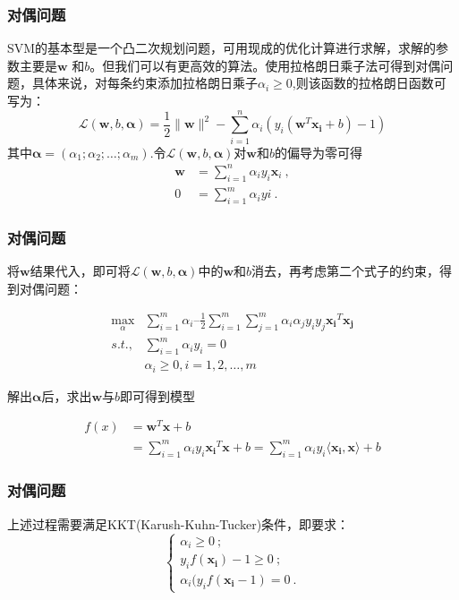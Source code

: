 \begin{frame}
\frametitle{对偶问题}
SVM的基本型是一个凸二次规划问题，可用现成的优化计算进行求解，求解的参数主要是$\boldsymbol{w}$ 和$b$。但我们可以有更高效的算法。使用拉格朗日乘子法可得到对偶问题，具体来说，对每条约束添加拉格朗日乘子$\alpha_i \ge0$,则该函数的拉格朗日函数可写为：
\[
\mathcal{L}(\boldsymbol{w},b,\boldsymbol{\alpha})=\frac{1}{2}\|\boldsymbol{w}\|^2-\sum_{i=1}^n\alpha_i \left(y_i(\boldsymbol{w}^T\boldsymbol{x_i}+b)-1\right)
\]
其中$\boldsymbol{\alpha} = (\alpha_1;\alpha_2;\dots;\alpha_m)$.令$\mathcal{L}(\boldsymbol{w},b,\boldsymbol{\alpha})$对$\boldsymbol{w}$和$b$的偏导为零可得
\begin{align*}
\boldsymbol{w} &= \sum_{i=1}^n\alpha_i y_i \boldsymbol{x}_i\ ,\\
0&=\sum_{i=1}^m\alpha_iyi\ .
\end{align*}

\end{frame}


\begin{frame}

\frametitle{对偶问题}

将$\boldsymbol{w}$结果代入，即可将$\mathcal{L}(\boldsymbol{w},b,\boldsymbol{\alpha})$中的$\boldsymbol{w}$和$b$消去，再考虑第二个式子的约束，得到对偶问题：

\begin{align*}
 \max_\alpha &\sum_{i=1}^m\alpha_i – \frac{1}{2}\sum_{i=1}^m\sum_{j=1}^m\alpha_i\alpha_jy_iy_j\boldsymbol{x_i}^T\boldsymbol{x_j} \\ 
 s.t.,&\sum_{i=1}^m\alpha_iy_i = 0 \\
  &\alpha_i\geq 0, i=1,2,\ldots,m
 \end{align*}

解出$\boldsymbol{\alpha}$后，求出$\boldsymbol{w}$与$b$即可得到模型

\begin{align*}
f(x)&=\boldsymbol{w}^T\boldsymbol{x}+b\\
&=\sum_{i=1}^m\alpha_i y_i \boldsymbol{x_i}^T\boldsymbol{x}+b 
= \sum_{i=1}^m\alpha_i y_i \langle\boldsymbol{x_i, x}\rangle + b
\end{align*}

\end{frame}


\begin{frame}

\frametitle{对偶问题}

上述过程需要满足KKT(Karush-Kuhn-Tucker)条件，即要求：
\[ 
\begin{cases}
\alpha_i \geq0\ ; \\
y_if(\boldsymbol{x_i})-1\geq 0\ ;\\
\alpha_i(y_if(\boldsymbol{x_i}-1)=0\ .
\end{cases} 
\]

\end{frame}


